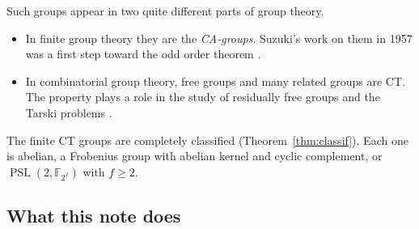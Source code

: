 \documentclass[12pt,letterpaper]{article}
\numberwithin{equation}{section}
\theoremstyle{plain}
\theoremstyle{definition}
\newcommand{\F}{\mathbb{F}}
\DeclareMathOperator{\PSL}{PSL}
\begin{document}
Such groups appear in two quite different parts of group theory.
\begin{itemize}[itemsep=1pt]
\item In finite group theory they are the \emph{CA-groups}. Suzuki's work on
  them in 1957 was a first step toward the odd order theorem
  \cite{Su57,BSW58}.
\item In combinatorial group theory, free groups and many related groups are
  CT. The property plays a role in the study of residually free groups and
  the Tarski problems \cite{Fi83,FR09,FGRS15}.
\end{itemize}
The finite CT groups are completely classified (Theorem~\ref{thm:classif}).
Each one is abelian, a Frobenius group with abelian kernel and cyclic
complement, or $\PSL(2,\F_{2^f})$ with $f\ge 2$.

\subsection{What this note does}
\end{document}
